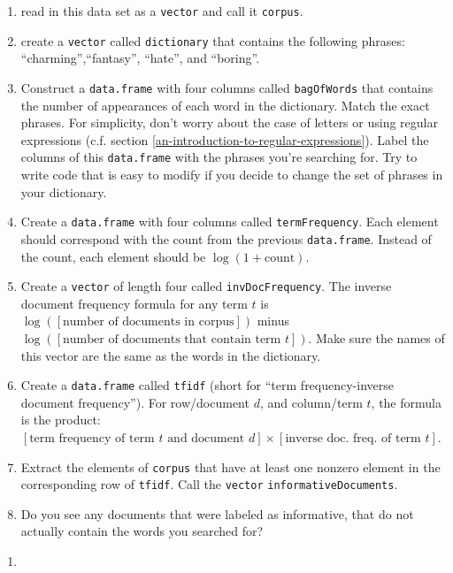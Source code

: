 \documentclass[
  12pt,
  krantz2]{krantz}
\providecommand{\tightlist}{%
  \setlength{\itemsep}{0pt}\setlength{\parskip}{0pt}}
\begin{document}
\begin{enumerate}
\def\labelenumi{\alph{enumi})}
\tightlist
\item
  read in this data set as a \texttt{vector} and call it \texttt{corpus}.
\item
  create a \texttt{vector} called \texttt{dictionary} that contains the following phrases: ``charming'',``fantasy'', ``hate'', and ``boring''.
\item
  Construct a \texttt{data.frame} with four columns called \texttt{bagOfWords} that contains the number of appearances of each word in the dictionary. Match the exact phrases. For simplicity, don't worry about the case of letters or using regular expressions (c.f. section \ref{an-introduction-to-regular-expressions}). Label the columns of this \texttt{data.frame} with the phrases you're searching for. Try to write code that is easy to modify if you decide to change the set of phrases in your dictionary.
\item
  Create a \texttt{data.frame} with four columns called \texttt{termFrequency}. Each element should correspond with the count from the previous \texttt{data.frame}. Instead of the count, each element should be \(\log(1 + \text{count})\).
\item
  Create a \texttt{vector} of length four called \texttt{invDocFrequency}. The inverse document frequency formula for any term \(t\) is \(\log([\text{number of documents in corpus}])\) minus \(\log([\text{number of documents that contain term } t])\). Make sure the names of this vector are the same as the words in the dictionary.
\item
  Create a \texttt{data.frame} called \texttt{tfidf} (short for ``term frequency-inverse document frequency''). For row/document \(d\), and column/term \(t\), the formula is the product: \([\text{term frequency of term } t \text{ and document } d ] \times [\text{inverse doc. freq. of term } t]\).
\item
  Extract the elements of \texttt{corpus} that have at least one nonzero element in the corresponding row of \texttt{tfidf}. Call the \texttt{vector} \texttt{informativeDocuments}.
\item
  Do you see any documents that were labeled as informative, that do not actually contain the words you searched for?
\end{enumerate}

\begin{enumerate}
\def\labelenumi{\arabic{enumi}.}
\setcounter{enumi}{1}
\tightlist
\item
\end{enumerate}
\end{document}
